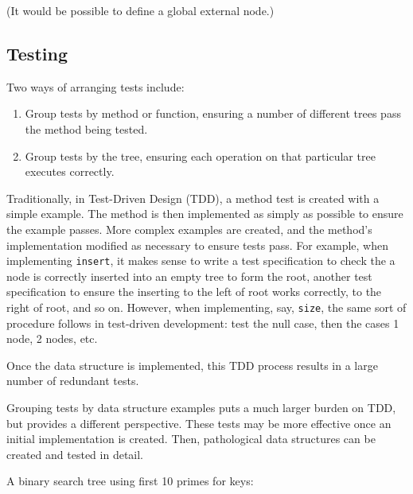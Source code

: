 \documentclass{article}
\begin{document}
(It would be possible to define a global external node.)

\subsection{Testing}

Two ways of arranging tests include:
\begin{enumerate}
\item Group tests by method or function, ensuring a number of different
trees pass the method being tested.
\item Group tests by the tree, ensuring each operation on that particular tree
executes correctly.
\end{enumerate}

Traditionally, in Test-Driven Design (TDD), a method test is created with a simple example.
The method is then implemented as simply as possible to ensure the example passes.
More complex examples are created, and the method's implementation modified as necessary
to ensure tests pass. For example, when implementing {\tt insert}, it makes sense
to write a test specification to check the a node is correctly inserted into an
empty tree to form the root, another test specification to ensure the inserting
to the left of root works correctly, to the right of root, and so on. However,
when implementing, say, {\tt size}, the same sort of procedure follows in test-driven
development: test the null case, then the cases 1 node, 2 nodes, etc.

Once the data structure is implemented, this TDD process results in a large number
of redundant tests.

Grouping tests by data structure examples puts a much larger burden on TDD,
but provides a different perspective. These tests may be more effective once an
initial implementation is created. Then, pathological data structures can be
created and tested in detail.


A binary search tree using first 10 primes for keys:

\end{document}
